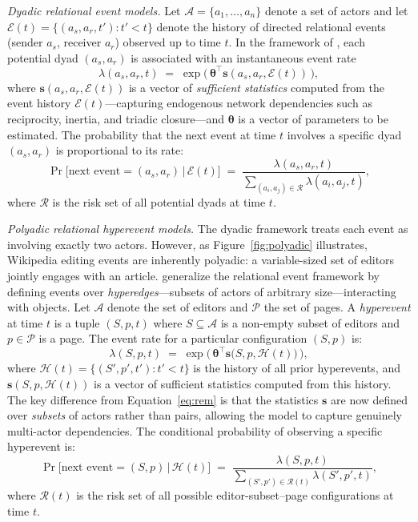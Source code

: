 \documentclass[11pt]{article}
\begin{document}
\emph{Dyadic relational event models.} Let $\mathcal{A} = \{a_1, \ldots, a_n\}$ denote a set of actors and let $\mathcal{E}(t) = \{(a_s, a_r, t') : t' < t\}$ denote the history of directed relational events (sender $a_s$, receiver $a_r$) observed up to time $t$. In the framework of \citet{Butts2008}, each potential dyad $(a_s, a_r)$ is associated with an instantaneous event rate
\begin{equation}
\lambda(a_s, a_r, t) \;=\; \exp\!\Big(\,\boldsymbol{\theta}^\top \mathbf{s}(a_s, a_r, \mathcal{E}(t))\,\Big),
\label{eq:rem}
\end{equation}
where $\mathbf{s}(a_s, a_r, \mathcal{E}(t))$ is a vector of \emph{sufficient statistics} computed from the event history $\mathcal{E}(t)$---capturing endogenous network dependencies such as reciprocity, inertia, and triadic closure---and $\boldsymbol{\theta}$ is a vector of parameters to be estimated. The probability that the next event at time $t$ involves a specific dyad $(a_s, a_r)$ is proportional to its rate:
\begin{equation}
\Pr\!\big[\text{next event} = (a_s, a_r) \,\big|\, \mathcal{E}(t)\big] \;=\; \frac{\lambda(a_s, a_r, t)}{\sum_{(a_i, a_j) \in \mathcal{R}} \lambda(a_i, a_j, t)},
\label{eq:rem_prob}
\end{equation}
where $\mathcal{R}$ is the risk set of all potential dyads at time $t$.

\emph{Polyadic relational hyperevent models.} The dyadic framework treats each event as involving exactly two actors. However, as Figure~\ref{fig:polyadic} illustrates, Wikipedia editing events are inherently polyadic: a variable-sized set of editors jointly engages with an article. \citet{Lerner2023} generalize the relational event framework by defining events over \emph{hyperedges}---subsets of actors of arbitrary size---interacting with objects. Let $\mathcal{A}$ denote the set of editors and $\mathcal{P}$ the set of pages. A \emph{hyperevent} at time $t$ is a tuple $(S, p, t)$ where $S \subseteq \mathcal{A}$ is a non-empty subset of editors and $p \in \mathcal{P}$ is a page. The event rate for a particular configuration $(S, p)$ is:
\begin{equation}
\lambda(S, p, t) \;=\; \exp\!\Big(\,\boldsymbol{\theta}^\top \mathbf{s}\big(S, p, \mathcal{H}(t)\big)\,\Big),
\label{eq:hyper}
\end{equation}
where $\mathcal{H}(t) = \{(S', p', t') : t' < t\}$ is the history of all prior hyperevents, and $\mathbf{s}(S, p, \mathcal{H}(t))$ is a vector of sufficient statistics computed from this history. The key difference from Equation~\eqref{eq:rem} is that the statistics $\mathbf{s}$ are now defined over \emph{subsets} of actors rather than pairs, allowing the model to capture genuinely multi-actor dependencies. The conditional probability of observing a specific hyperevent is:
\begin{equation}
\Pr\!\big[\text{next event} = (S, p) \,\big|\, \mathcal{H}(t)\big] \;=\; \frac{\lambda(S, p, t)}{\sum_{(S', p') \in \mathcal{R}(t)} \lambda(S', p', t)},
\label{eq:hyper_prob}
\end{equation}
where $\mathcal{R}(t)$ is the risk set of all possible editor-subset--page configurations at time $t$.
\end{document}
